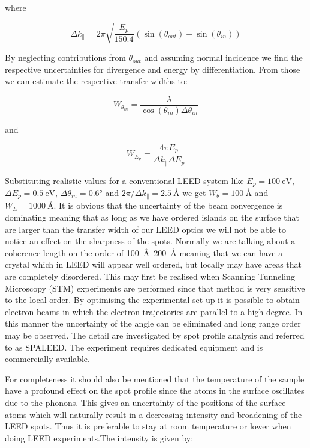 \noindent where

\begin{equation}
\Delta k_{\parallel}=2\pi\sqrt{\frac{E_p}{150.4}}(\sin(\theta_{out})-\sin(\theta_{in}))
\end{equation} 

By neglecting contributions from $\theta_{out}$ and assuming normal incidence we find the respective uncertainties for divergence and energy by differentiation. From those we can estimate the respective transfer widths to:

\begin{equation}
W_{\theta_{in}}=\frac{\lambda}{\cos(\theta_{in})\Delta\theta_{in}}
\end{equation}

\noindent and 

\begin{equation}
W_{E_p}=\frac{4\pi E_p}{\Delta k_{\parallel}\Delta E_p}
\end{equation}

Substituting realistic values for a conventional LEED system like $E_p=\SI{100}{\electronvolt}$, $\Delta E_p=\SI{0.5}{\electronvolt}$, $\Delta\theta_{in}=\ang{0.6}$ and $2\pi /\Delta k_{\parallel}=\SI{2.5}{\angstrom}$ we get $W_{\theta}=\SI{100}{\angstrom}$ and $W_E=\SI{1000}{\angstrom}$. It is obvious that the uncertainty of the beam convergence is dominating meaning that as long as we have ordered islands on the surface that are larger than the transfer width of our LEED optics we will not be able to notice an effect on the sharpness of the spots. Normally we are talking about a coherence length on the order of \SIrange{100}{200}{\angstrom} meaning that we can have a crystal which in LEED will appear well ordered, but locally may have areas that are completely disordered. This may first be realised when Scanning Tunneling Microscopy (STM) experiments are performed since that method is very sensitive to the local order. By optimising the experimental set-up it is possible to obtain electron beams in which the electron trajectories are parallel to a high degree. In this manner the uncertainty of the angle can be eliminated and long range order may be observed. The detail are investigated by spot profile analysis and referred to as SPALEED. The experiment requires dedicated equipment and is commercially available.

For completeness it should also be mentioned that the temperature of the sample have a profound effect on the spot profile since the atoms in the surface oscillates due to the phonons. This gives an uncertainty of the positions of the surface atoms which will naturally result in a decreasing intensity and broadening of the LEED spots. Thus it is preferable to stay at room temperature or lower when doing LEED experiments.The intensity is given by:

